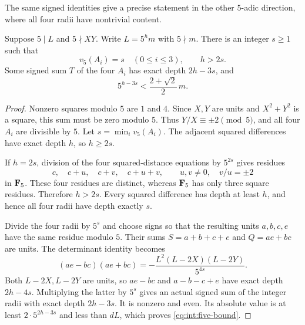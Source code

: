 The same signed identities give a precise statement in the other
$5$-adic direction, where all four radii have nontrivial content.

\begin{proposition}
\label{prop:int:five-depth}
Suppose $5\mid L$ and $5\nmid XY$. Write $L=5^h m$ with $5\nmid m$.
There is an integer $s\ge1$ such that
\[
 v_5(A_i)=s\quad(0\le i\le3),\qquad h>2s.
\]
Some signed sum $T$ of the four $A_i$ has exact depth $2h-3s$,
and
\begin{equation}\label{eq:int:five-bound}
 5^{h-3s}<\frac{2+\sqrt2}{2}\,m.
\end{equation}
\end{proposition}

\begin{proof}
Nonzero squares modulo $5$ are $1$ and $4$. Since $X,Y$ are units
and $X^2+Y^2$ is a square, this sum must be zero modulo $5$.
Thus $Y/X\equiv\pm2\pmod5$, and all four $A_i$ are divisible by $5$.
Let $s=\min_i v_5(A_i)$. The adjacent squared differences have
exact depth $h$, so $h\ge2s$.

If $h=2s$, division of the four squared-distance equations by
$5^{2s}$ gives residues
\[
 c,\quad c+u,\quad c+v,\quad c+u+v,
 \qquad u,v\ne0,\quad v/u=\pm2
\]
in $\mathbf F_5$. These four residues are distinct, whereas $\mathbf F_5$ has
only three square residues. Therefore $h>2s$. Every squared
difference has depth at least $h$, and hence all four radii have
depth exactly $s$.

Divide the four radii by $5^s$ and choose signs so that the resulting
units $a,b,c,e$ have the same residue modulo $5$. Their sums
$S=a+b+c+e$ and $Q=ae+bc$ are units. The determinant identity becomes
\[
 (ae-bc)(ae+bc)=-\frac{L^2(L-2X)(L-2Y)}{5^{4s}}.
\]
Both $L-2X,L-2Y$ are units, so $ae-bc$ and
$a-b-c+e$ have exact depth $2h-4s$. Multiplying the latter by
$5^s$ gives an actual signed sum of the integer radii with exact
depth $2h-3s$. It is nonzero and even. Its absolute value is at
least $2\cdot5^{2h-3s}$ and less than $dL$, which proves
\eqref{eq:int:five-bound}.
\end{proof}
